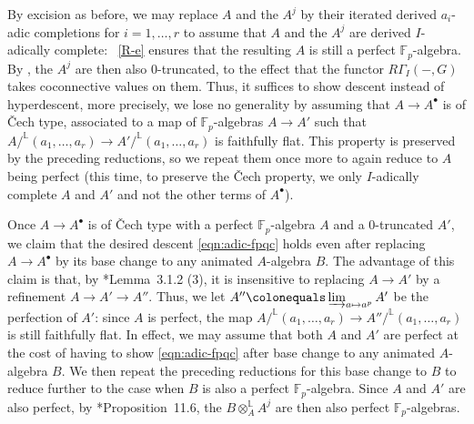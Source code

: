 \documentclass[11pt, reqno]{amsart}
\newcommand{\bF}{\mathbb{F}}
\newcommand{\bL}{\mathbb{L}}
\newcommand{\ce}{\colonequals}
\newcommand{\ra}{\rightarrow}
\newcommand{\tensor}{\otimes} 			%
\numberwithin{equation}{numberingbase}
\theoremstyle{thms}
\theoremstyle{claims}
\theoremstyle{defs}
\theoremstyle{thms}
\theoremstyle{defs}
\theoremstyle{subsection-tweak}
\theoremstyle{subsection-tweak}
\begin{document}
By excision  as before, we may replace $A$ and the $A^j$ by their iterated derived $a_i$-adic completions for $i = 1, \dotsc, r$ to assume that $A$ and the $A^j$ are derived $I$-adically complete: ~\ref{R-e} ensures that the resulting $A$ is still a perfect $\bF_p$-algebra. By , the $A^j$ are then also $0$-truncated, to the effect that the functor $R\Gamma_I(-, G)$ takes coconnective values on them. Thus, it suffices to show descent instead of hyperdescent, more precisely, we lose no generality by assuming that $A \ra A^\bullet$ is of \v{C}ech type, associated to a map of $\bF_p$-algebras $A \ra A'$ such that $A/^\bL (a_1, \dotsc, a_r) \ra A'/^\bL (a_1, \dotsc, a_r)$ is faithfully flat. This property is preserved by the preceding reductions, so we repeat them once more to again reduce to $A$ being perfect (this time, to preserve the \v{C}ech property, we only $I$-adically complete $A$ and $A'$ and not the other terms of $A^\bullet$). 

Once $A \ra A^\bullet$ is of \v{C}ech type with a perfect $\bF_p$-algebra $A$ and a $0$-truncated $A'$, we claim that the desired descent \eqref{eqn:adic-fpqc} holds even after replacing $A \ra A^\bullet$ by its base change to any animated $A$-algebra $B$. The advantage of this claim is that, by \cite{LZ17}*{Lemma~3.1.2 (3)},  it is insensitive to replacing $A \ra A'$ by a refinement $A \ra A' \ra A''$. Thus, we let $A'' \ce \varinjlim_{a \mapsto a^p} A'$ be the perfection of $A'$: since $A$ is perfect, the map $A/^\bL (a_1, \dotsc, a_r) \ra A'' /^\bL (a_1, \dotsc, a_r)$ is still faithfully flat. In effect, we may assume that both $A$ and $A'$ are perfect at the cost of having to show \eqref{eqn:adic-fpqc} after base change to any animated $A$-algebra $B$. We then repeat the preceding reductions for this base change to $B$ to reduce further to the case when $B$ is also a perfect $\bF_p$-algebra. Since $A$ and $A'$ are also perfect, by \cite{BS17}*{Proposition~11.6}, the $B \tensor^\bL_A A^j$ are then also perfect $\bF_p$-algebras. 
\end{document}
